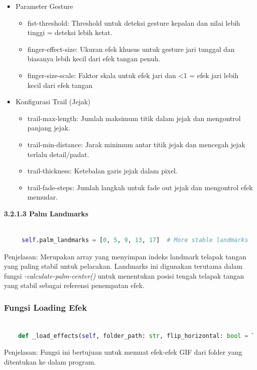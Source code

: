 \documentclass[11pt,a4paper]{article}
\begin{document}
\begin{itemize}
\begin{itemize}
        \end{itemize}
        \item Parameter Gesture
        \begin{itemize}
            \item fist-threshold: Threshold untuk deteksi gesture kepalan dan nilai lebih tinggi = deteksi lebih ketat.
            \item finger-effect-size: Ukuran efek khusus untuk gesture jari tunggal dan biasanya lebih kecil dari efek tangan penuh.
            \item finger-size-scale: Faktor skala untuk efek jari dan <1 = efek jari lebih kecil dari efek tangan
        \end{itemize}
        \item Konfigurasi Trail (Jejak)
        \begin{itemize}
            \item trail-max-length: Jumlah maksimum titik dalam jejak dan mengontrol panjang jejak.
            \item trail-min-distance: Jarak minimum antar titik jejak dan mencegah jejak terlalu detail/padat.
            \item trail-thickness: Ketebalan garis jejak dalam pixel.
            \item trail-fade-steps: Jumlah langkah untuk fade out jejak dan mengontrol efek memudar.
        \end{itemize}
    \end{itemize}
    \noindent\textbf{3.2.1.3 Palm Landmarks}
    \begin{lstlisting}[language=Python, caption= Palm Landmarks]
    
     self.palm_landmarks = [0, 5, 9, 13, 17]  # More stable landmarks
    \end{lstlisting}
    Penjelasan:
    Merupakan array yang menyimpan indeks landmark telapak tangan yang paling stabil untuk pelacakan. Landmarks ini digunakan terutama dalam fungsi \textit{-calculate-palm-center()} untuk menentukan posisi tengah telapak tangan yang stabil sebagai referensi penempatan efek.
    
    \subsubsection{Fungsi Loading Efek}
    \begin{lstlisting}[language=Python, caption=Loading Efek]
    
    def _load_effects(self, folder_path: str, flip_horizontal: bool = True) -> Dict:
    \end{lstlisting}
    Penjelasan: Fungsi ini bertujuan untuk memuat efek-efek GIF dari folder yang ditentukan ke dalam program.
\end{document}
